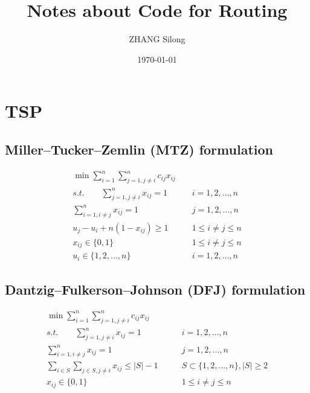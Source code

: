 \documentclass[UTF8]{article}
\title{\textbf{\Large Notes about Code for Routing}}
\author{ZHANG Silong}
\date{\today}
\begin{document}
\maketitle

\section{TSP}

	\subsection{Miller–Tucker–Zemlin (MTZ) formulation}
		\begin{align*}
			\min \sum_{i = 1}^{n} \sum_{j = 1, j \ne i}^{n} c_{ij} x_{ij} & \\
			s.t. \qquad \sum_{j = 1, j \ne i}^{n} x_{ij} = 1 \qquad & i = 1, 2, \ldots, n \\
			\sum_{i = 1, i \ne j}^{n}  x_{ij} = 1 \qquad & j = 1, 2, \ldots, n \\
			u_j - u_i + n(1 - x_{ij}) \ge 1 \qquad & 1 \le i \ne j \le n \\
			x_{ij} \in \{0, 1\} \qquad & 1 \le i \ne j \le n \\
			u_i \in \{1, 2, \ldots, n\} \qquad & i = 1, 2, \ldots, n 
		\end{align*}

	\subsection{Dantzig–Fulkerson–Johnson (DFJ) formulation}
		\begin{align*}
			\min \sum_{i = 1}^{n} \sum_{j = 1, j \ne i}^{n} c_{ij} x_{ij} & \\
			s.t. \qquad \sum_{j = 1, j \ne i}^{n} x_{ij} = 1 \qquad & i = 1, 2, \ldots, n \\
			\sum_{i = 1, i \ne j}^{n}  x_{ij} = 1 \qquad & j = 1, 2, \ldots, n \\
			\sum_{i \in S} \sum_{j \in S, j \ne i} x_{ij} \le |S| - 1 \qquad & S \subset \{1, 2, \ldots, n\}, |S| \ge 2 \\
			x_{ij} \in \{0, 1\} \qquad & 1 \le i \ne j \le n 
		\end{align*}
\end{document}
